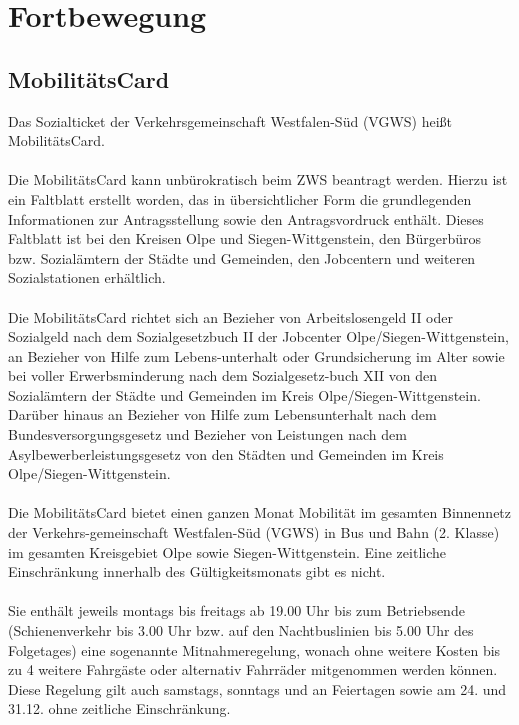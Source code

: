 \chapter{Fortbewegung}

\section{MobilitätsCard}

Das Sozialticket der Verkehrsgemeinschaft Westfalen-Süd (VGWS) heißt MobilitätsCard. \\
\\
Die MobilitätsCard kann unbürokratisch beim ZWS beantragt werden. Hierzu ist ein Faltblatt erstellt worden, das in übersichtlicher Form die grundlegenden Informationen zur Antragsstellung sowie den Antragsvordruck enthält. Dieses Faltblatt ist bei den Kreisen Olpe und Siegen-Wittgenstein, den Bürgerbüros bzw. Sozialämtern der Städte und Gemeinden, den Jobcentern und weiteren Sozialstationen erhältlich.\\
\\
Die MobilitätsCard richtet sich an Bezieher von Arbeitslosengeld II oder Sozialgeld nach dem Sozialgesetzbuch II der Jobcenter Olpe/Siegen-Wittgenstein, an Bezieher von Hilfe zum Lebens-unterhalt oder Grundsicherung im Alter sowie bei voller Erwerbsminderung nach dem Sozialgesetz-buch XII von den Sozialämtern der Städte und Gemeinden im Kreis Olpe/Siegen-Wittgenstein. Darüber hinaus an Bezieher von Hilfe zum Lebensunterhalt nach dem Bundesver\-sorgungsgesetz und Bezieher von Leistungen nach dem Asylbewerberleistungsgesetz von den Städten und Gemeinden im Kreis Olpe/Siegen-Wittgenstein.\\
\\
Die MobilitätsCard bietet einen ganzen Monat Mobilität im gesamten Binnennetz der Verkehrs-gemeinschaft Westfalen-Süd (VGWS) in Bus und Bahn (2. Klasse) im gesamten Kreisgebiet Olpe sowie Siegen-Wittgenstein. Eine zeitliche Einschränkung innerhalb des Gültigkeitsmonats gibt es nicht.\\
\\
Sie enthält jeweils montags bis freitags ab 19.00 Uhr bis zum Betriebsende (Schienenverkehr bis 3.00 Uhr bzw. auf den Nachtbuslinien bis 5.00 Uhr des Folgetages) eine sogenannte Mitnahmeregelung, wonach ohne weitere Kosten bis zu 4 weitere Fahrgäste oder alternativ Fahrräder mitgenommen werden können. Diese Regelung gilt auch samstags, sonntags und an Feiertagen sowie am 24. und 31.12. ohne zeitliche Einschränkung.\\
